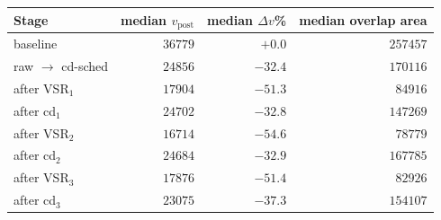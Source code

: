 \begin{tabular}{l|rrr}
\toprule
Stage & median $v_\text{post}$ & median $\Delta v$\% & median overlap area \\
\midrule
baseline & $36779$ & $+0.0$ & $257457$ \\
raw $\to$ cd-sched & $24856$ & $-32.4$ & $170116$ \\
after VSR$_1$ & $17904$ & $-51.3$ & $84916$ \\
after cd$_1$ & $24702$ & $-32.8$ & $147269$ \\
after VSR$_2$ & $16714$ & $-54.6$ & $78779$ \\
after cd$_2$ & $24684$ & $-32.9$ & $167785$ \\
after VSR$_3$ & $17876$ & $-51.4$ & $82926$ \\
after cd$_3$ & $23075$ & $-37.3$ & $154107$ \\
\bottomrule
\end{tabular}
